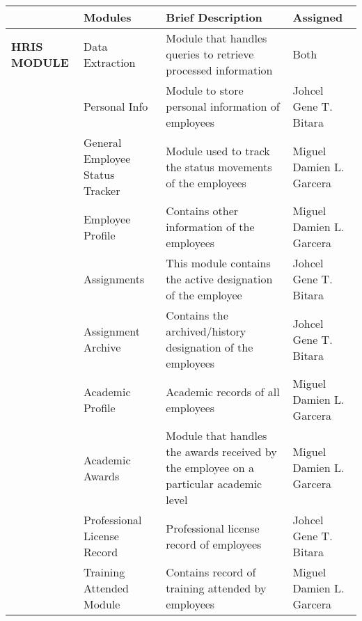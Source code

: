\begin{table}[H]
    \begin{tabular}{@{}p{2cm}p{3.5cm}p{6cm}p{3.5cm}@{}}
    \toprule
    \multicolumn{1}{l}{} & \textbf{Modules}                         & \textbf{Brief Description}                                                            & \textbf{Assigned}  \\ \midrule
    \textbf{HRIS MODULE} & Data Extraction                          & Module that handles queries to retrieve processed information                         & Both               \\
                        & Personal Info                            & Module to store personal information of employees                                     & Johcel Gene T. Bitara               \\
                        & General Employee Status Tracker          & Module used to track the status movements of the employees                            & Miguel Damien L. Garcera               \\
                        & Employee Profile                         & Contains other information of the employees                                           & Miguel Damien L. Garcera               \\
                        & Assignments                              & This module contains the active designation of the employee                           & Johcel Gene T. Bitara               \\
                        & Assignment Archive                       & Contains the archived/history designation of the employees                            & Johcel Gene T. Bitara               \\
                        & Academic Profile                         & Academic records of all employees                                                     & Miguel Damien L. Garcera               \\
                        & Academic Awards                          & Module that handles the awards received by the employee on a particular academic level & Miguel Damien L. Garcera                \\
                        & Professional License Record              & Professional license record of employees                                              & Johcel Gene T. Bitara               \\
                        & Training Attended Module                 & Contains record of training attended by employees                                     & Miguel Damien L. Garcera               \\

\end{tabular}
\end{table}
